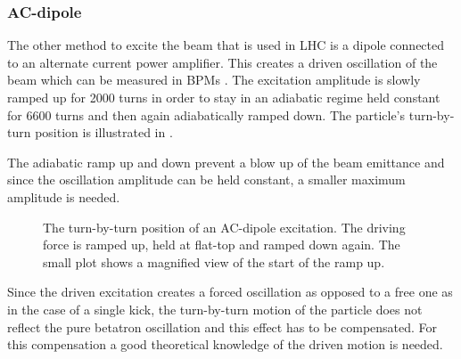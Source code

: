 \subsubsection{AC-dipole}

The other method to excite the beam that is used in LHC is a dipole connected to an alternate current
power amplifier.
This creates a driven oscillation of the beam \cite{Peggs1998} which can be measured in BPMs \cite{Miyamoto2008, Miyamoto2010}.
The excitation amplitude is slowly ramped up for 2000 turns in order to stay in an
adiabatic regime \cite{Tomas2005ac} held constant for 6600 turns and then again adiabatically ramped down.
The particle's turn-by-turn position is illustrated in .

The adiabatic ramp up and down prevent a blow up of the beam emittance and since the oscillation amplitude
can be held constant, a smaller maximum amplitude is needed. 
%
\begin{figure}[h]
    \centering
    \caption{
        The turn-by-turn position of an AC-dipole excitation. The driving force is ramped up,
        held at flat-top and ramped down again.
        The small plot shows a magnified view of the start of the ramp up.
    }
    \label{fig_ac_plot}
\end{figure}
%
Since the driven excitation creates a forced oscillation as opposed to a free one as in the case of
a single kick, the turn-by-turn motion of the particle does not reflect the pure betatron oscillation
and this effect has to be compensated. For this compensation a good theoretical knowledge of the driven
motion is needed.

